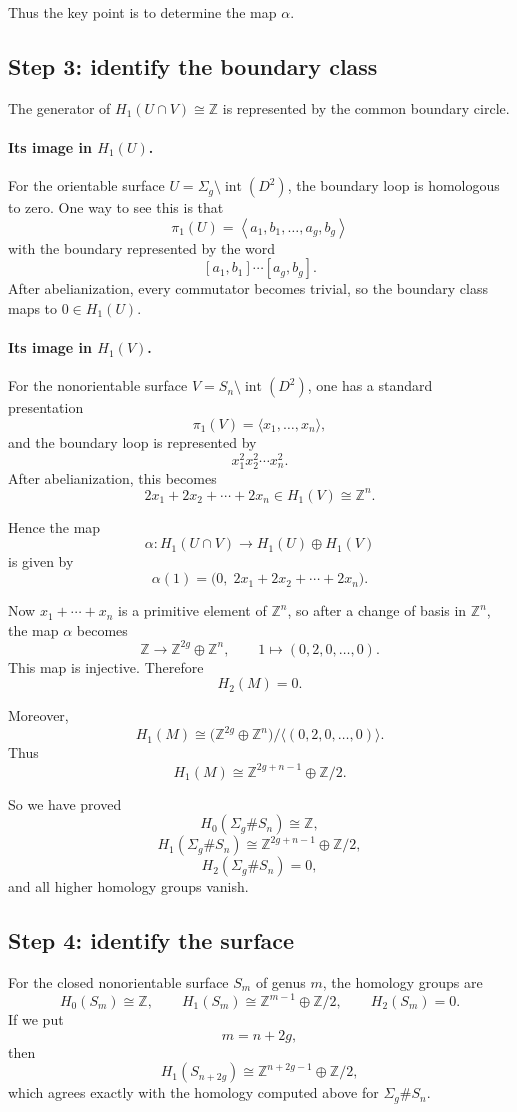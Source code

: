 \documentclass[12pt,a4paper]{article}
\theoremstyle{notespace}
\begin{document}
Thus the key point is to determine the map \(\alpha\).

\subsection*{Step 3: identify the boundary class}
The generator of \(H_1(U\cap V)\cong \mathbb Z\) is represented by the common boundary circle.

\paragraph{Its image in \(H_1(U)\).}
For the orientable surface \(U=\Sigma_g\setminus \operatorname{int}(D^2)\), the boundary loop is homologous to zero. One way to see this is that
\[
\pi_1(U)=
\left\langle
a_1,b_1,\dots,a_g,b_g
\right\rangle
\]
with the boundary represented by the word
\[
[a_1,b_1]\cdots [a_g,b_g].
\]
After abelianization, every commutator becomes trivial, so the boundary class maps to \(0\in H_1(U)\).

\paragraph{Its image in \(H_1(V)\).}
For the nonorientable surface \(V=S_n\setminus \operatorname{int}(D^2)\), one has a standard presentation
\[
\pi_1(V)=\langle x_1,\dots,x_n\rangle,
\]
and the boundary loop is represented by
\[
x_1^2x_2^2\cdots x_n^2.
\]
After abelianization, this becomes
\[
2x_1+2x_2+\cdots+2x_n
\in H_1(V)\cong \mathbb Z^n.
\]

Hence the map
\[
\alpha:H_1(U\cap V)\to H_1(U)\oplus H_1(V)
\]
is given by
\[
\alpha(1)=\bigl(0,\;2x_1+2x_2+\cdots+2x_n\bigr).
\]

Now \(x_1+\cdots+x_n\) is a primitive element of \(\mathbb Z^n\), so after a change of basis in \(\mathbb Z^n\), the map \(\alpha\) becomes
\[
\mathbb Z\to \mathbb Z^{2g}\oplus \mathbb Z^n,
\qquad
1\mapsto (0,2,0,\dots,0).
\]
This map is injective. Therefore
\[
H_2(M)=0.
\]

Moreover,
\[
H_1(M)\cong
\bigl(\mathbb Z^{2g}\oplus \mathbb Z^n\bigr)\big/\langle (0,2,0,\dots,0)\rangle.
\]
Thus
\[
H_1(M)\cong \mathbb Z^{2g+n-1}\oplus \mathbb Z/2.
\]

So we have proved
\[
H_0(\Sigma_g\# S_n)\cong \mathbb Z,
\]
\[
H_1(\Sigma_g\# S_n)\cong \mathbb Z^{2g+n-1}\oplus \mathbb Z/2,
\]
\[
H_2(\Sigma_g\# S_n)=0,
\]
and all higher homology groups vanish.

\subsection*{Step 4: identify the surface}
For the closed nonorientable surface \(S_m\) of genus \(m\), the homology groups are
\[
H_0(S_m)\cong \mathbb Z,
\qquad
H_1(S_m)\cong \mathbb Z^{m-1}\oplus \mathbb Z/2,
\qquad
H_2(S_m)=0.
\]
If we put
\[
m=n+2g,
\]
then
\[
H_1(S_{n+2g})\cong \mathbb Z^{n+2g-1}\oplus \mathbb Z/2,
\]
which agrees exactly with the homology computed above for \(\Sigma_g\# S_n\).
\end{document}
